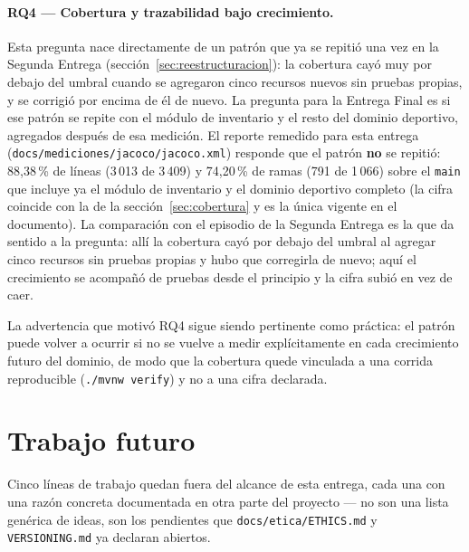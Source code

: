 \documentclass[11pt,a4paper]{article}
\newcommand{\ruta}[1]{\texttt{\footnotesize #1}}
\begin{document}
\paragraph{RQ4 — Cobertura y trazabilidad bajo crecimiento.} Esta pregunta
nace directamente de un patrón que ya se repitió una vez en la Segunda
Entrega (sección~\ref{sec:reestructuracion}): la cobertura cayó muy por
debajo del umbral cuando se agregaron cinco recursos nuevos sin pruebas
propias, y se corrigió por encima de él de nuevo. La pregunta para la
Entrega Final es si ese patrón
se repite con el módulo de inventario y el resto del dominio deportivo,
agregados después de esa medición. El reporte remedido para esta entrega
(\ruta{docs/mediciones/jacoco/jacoco.xml}) responde que el patrón
\textbf{no} se repitió: 88{,}38\,\% de líneas (3\,013 de 3\,409) y
74{,}20\,\% de ramas (791 de 1\,066) sobre el \texttt{main} que incluye ya
el módulo de inventario y el dominio deportivo completo (la cifra coincide
con la de la sección~\ref{sec:cobertura} y es la única vigente en el
documento). La comparación con el episodio de la Segunda Entrega es la que
da sentido a la pregunta: allí la cobertura cayó por debajo del umbral al
agregar cinco recursos sin pruebas propias y hubo que corregirla de
nuevo; aquí el crecimiento se acompañó de pruebas desde el principio y la
cifra subió en vez de caer.

La advertencia que motivó RQ4 sigue siendo pertinente como práctica:
el patrón puede volver a ocurrir si no se vuelve a medir explícitamente
en cada crecimiento futuro del dominio, de modo que la cobertura quede
vinculada a una corrida reproducible (\texttt{./mvnw verify}) y no a una
cifra declarada.

\section{Trabajo futuro}
\label{sec:trabajo-futuro}

Cinco líneas de trabajo quedan fuera del alcance de esta entrega, cada una
con una razón concreta documentada en otra parte del proyecto — no son una
lista genérica de ideas, son los pendientes que \ruta{docs/etica/ETHICS.md}
y \ruta{VERSIONING.md} ya declaran abiertos.
\end{document}
